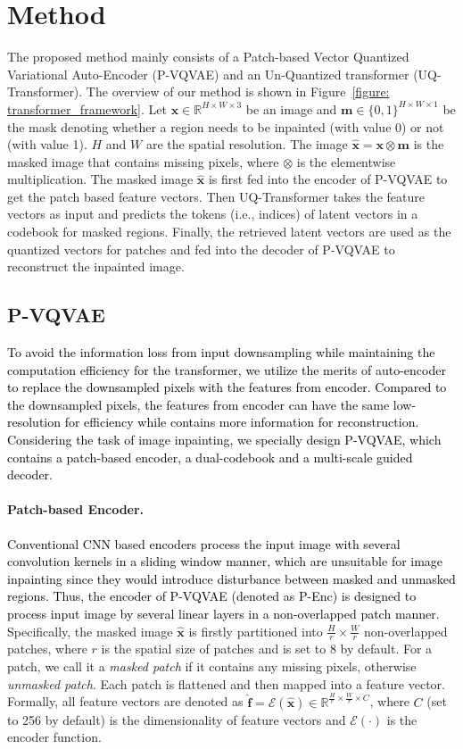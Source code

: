 \documentclass[10pt,twocolumn,letterpaper]{article}
\newcommand{\Fref}[1]{Figure~\ref{#1}}
\newcommand{\qchu}[1]{\textcolor{black}{#1}}
\begin{document}
\section{Method}
\label{sec: method}
The proposed method mainly consists of a Patch-based Vector Quantized Variational Auto-Encoder (P-VQVAE) and an Un-Quantized transformer (UQ-Transformer). The overview of our method is shown in \Fref{figure: transformer_framework}. Let ${\mathbf x} \in \mathbb{R}^{H \times W \times 3}$ be an image and ${\mathbf m} \in \{0,1\}^{H \times W \times 1}$ be the mask denoting whether a region needs to be inpainted (with value 0) or not (with value 1). $H$ and $W$ are the spatial resolution. The image $\mathbf{\hat{x}}=\mathbf{x} \otimes \mathbf{m}$ is the masked image that contains missing pixels, where $\otimes$ is the elementwise multiplication. 
The masked image $\mathbf{\hat{x}}$ is first fed into the encoder of P-VQVAE to get the patch based feature vectors. Then UQ-Transformer takes the feature vectors as input and predicts the tokens (i.e., indices) of latent vectors in a codebook for masked regions. 
Finally, the retrieved latent vectors are used as the quantized vectors for patches
and fed into the decoder of P-VQVAE to reconstruct the inpainted image.

\subsection{P-VQVAE}
\label{sec: p_vqvae}
\qchu{To avoid the information loss from input downsampling while maintaining the computation efficiency for the transformer, we utilize the merits of auto-encoder to replace the downsampled pixels with the features from encoder. Compared to the downsampled pixels, the features from encoder can have the same low-resolution  for efficiency while contains more information for reconstruction. Considering the task of image inpainting, we specially design P-VQVAE, which contains a patch-based encoder, a dual-codebook and a multi-scale guided decoder.}

\paragraph{Patch-based Encoder.}
\label{sec: p_enc}
\qchu{Conventional CNN based encoders process the input image with several convolution kernels in a sliding window manner, which are unsuitable for image inpainting since they would introduce disturbance between masked and unmasked regions. Thus, the encoder of P-VQVAE (denoted as P-Enc) is designed to process input image by several linear layers in a non-overlapped patch manner.}
Specifically, the masked image $\mathbf{\hat{x}}$ is firstly partitioned into $\frac{H}{r} \times \frac{W}{r}$ non-overlapped patches, where $r$ is the spatial size of patches and is set to 8 by default. For a patch, we call it a \emph{masked patch} if it contains any missing pixels, otherwise \emph{unmasked patch}.
Each patch is flattened and then mapped into a feature vector.
Formally, all feature vectors are denoted as $\mathbf{\hat{f}} = \mathcal{E}(\mathbf{\hat{x}})\in \mathbb{R}^{\frac{H}{r}\times\frac{W}{r}\times C}$, where $C$ (set to 256 by default) is the dimensionality of feature vectors and $\mathcal{E}(\cdot)$ is the encoder function. 
\end{document}
